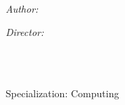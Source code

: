 \documentclass[
11pt, %
oneside, %
english, %
singlespacing, %
headsepline, %
table,
]{MastersDoctoralThesis} %
\author{Robert \textsc{Planas}} %
\begin{document}
\frontmatter %

\pagestyle{plain} %


\begin{titlepage}
\begin{center}

\vspace*{.06\textheight}
{\scshape\LARGE \univname\par}\vspace{0.5cm} %
\textsc{\Large \facname}\\[1.5cm] %

\HRule \\[0.4cm] %
{\huge \bfseries \ttitle\par}\vspace{0.4cm} %
\HRule \\[1.5cm] %
 
\begin{minipage}[t]{0.4\textwidth}
\begin{flushleft} \large
\emph{Author:}\\
\href{http://www.hubbit86.com}{\authorname} %
\end{flushleft}
\end{minipage}
\begin{minipage}[t]{0.4\textwidth}
\begin{flushright} \large
\emph{Director:} \\
\href{https://www.cs.upc.edu/~belanche/}{\supname} %
\end{flushright}
\end{minipage}\\[4cm]

\vfill

\large \degreename\\ %
\large Specialization:  Computing\\[0.5cm] %


\end{center}
\end{titlepage}
\end{document}

